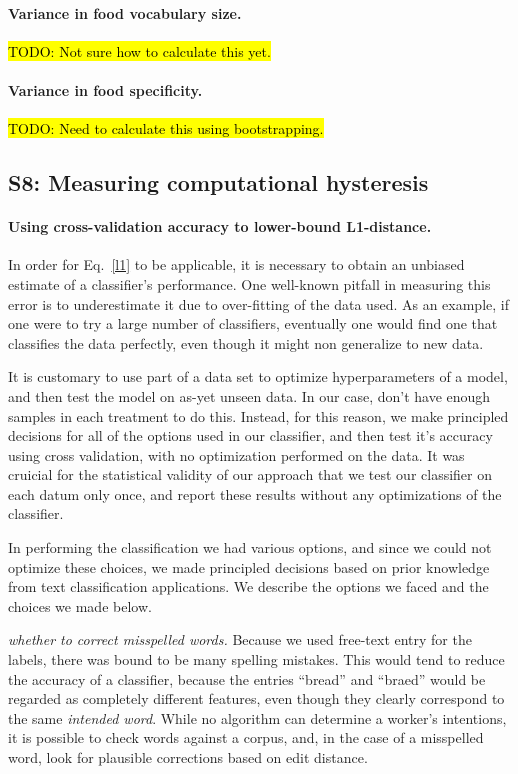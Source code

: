 \documentclass[12pt]{article}
\newcommand{\td}[1]{{\color{blu}\hl{TODO: #1}}}
\begin{document}
	\paragraph{Variance in food vocabulary size.}
	\td{Not sure how to calculate this yet.}

	\paragraph{Variance in food specificity.}
	\td{Need to calculate this using bootstrapping.}


\subsection*{S8: Measuring computational hysteresis}
	\paragraph{Using cross-validation accuracy to lower-bound L1-distance.}
	In order for Eq.~\ref{l1} to be applicable, it is necessary to obtain
	an unbiased estimate of a classifier's performance.  One well-known
	pitfall in measuring this error is to underestimate it due to 
	over-fitting of the data used.  As an example, if one were to try 
	a large number of classifiers, eventually one would find one that
	classifies the data perfectly, even though it might non generalize to
	new data.

	It is customary to use part of a data set to optimize hyperparameters of
	a model, and then test the model on as-yet unseen data.  In our case,
	don't have enough samples in each treatment to do this.  Instead, for 
	this reason, we make principled decisions for all of the options used
	in our classifier, and then test it's accuracy using cross validation,
	with no optimization performed on the data.  It was cruicial for 
	the statistical validity of our approach that we test our classifier on 
	each datum only once, and report these results without any optimizations
	of the classifier.

	In performing the classification we had various options, and since we
	could not optimize these choices, we made principled decisions based on
	prior knowledge from text classification applications.  We describe the
	options we faced and the choices we made below.

	\textit{whether to correct misspelled words.}  Because we used free-text
	entry for the labels, there was bound to be many spelling mistakes.
	This would tend to reduce the accuracy of a classifier, because the 
	entries ``bread'' and ``braed'' would be regarded as completely different
	features, even though they clearly correspond to the same 
	\textit{intended word}.  While no algorithm can determine a worker's 
	intentions, it is possible to check words against a corpus, and, in the
	case of a misspelled word, look for plausible corrections based on 
	edit distance.
\end{document}
